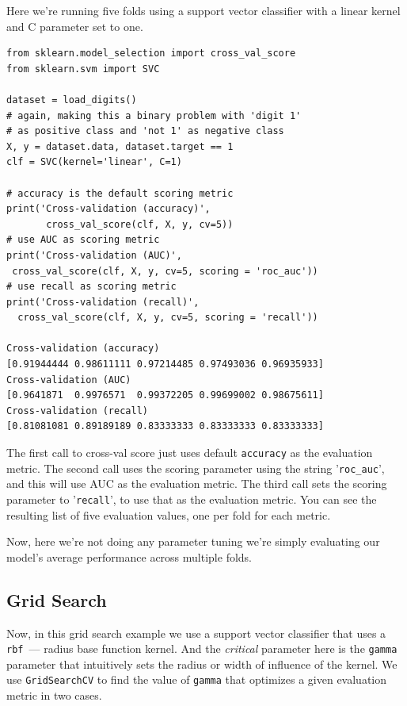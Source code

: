 \begin{multicols}{2}
Here we're running five folds using a support vector classifier with a linear kernel and C parameter set to one. 

{\scriptsize
\begin{verbatim}
from sklearn.model_selection import cross_val_score
from sklearn.svm import SVC

dataset = load_digits()
# again, making this a binary problem with 'digit 1' 
# as positive class and 'not 1' as negative class
X, y = dataset.data, dataset.target == 1
clf = SVC(kernel='linear', C=1)

# accuracy is the default scoring metric
print('Cross-validation (accuracy)', 
       cross_val_score(clf, X, y, cv=5))
# use AUC as scoring metric
print('Cross-validation (AUC)', 
 cross_val_score(clf, X, y, cv=5, scoring = 'roc_auc'))
# use recall as scoring metric
print('Cross-validation (recall)', 
  cross_val_score(clf, X, y, cv=5, scoring = 'recall'))

Cross-validation (accuracy) 
[0.91944444 0.98611111 0.97214485 0.97493036 0.96935933]
Cross-validation (AUC) 
[0.9641871  0.9976571  0.99372205 0.99699002 0.98675611]
Cross-validation (recall) 
[0.81081081 0.89189189 0.83333333 0.83333333 0.83333333]
\end{verbatim}
}

The first call to cross-val score just uses default \texttt{accuracy} as the evaluation metric. The second call uses the scoring parameter using the string '\texttt{roc_auc}', and this will use AUC as the evaluation metric. The third call sets the scoring parameter to '\texttt{recall}', to use that as the evaluation metric. You can see the resulting list of five evaluation values, one per fold for each metric. 

Now, here we're not doing any parameter tuning we're simply evaluating our model's average performance across multiple folds. 

\subsection{Grid Search}

Now, in this grid search example we use a support vector classifier that uses a \texttt{rbf}~--- radius base function kernel. And the \emph{critical} parameter here is the \texttt{gamma} parameter that intuitively sets the radius or width of influence of the kernel. We use \texttt{GridSearchCV} to find the value of \texttt{gamma} that optimizes a given evaluation metric in two cases. 


\end{multicols}
